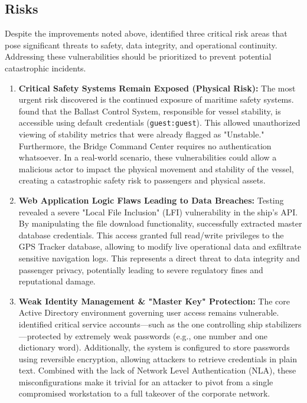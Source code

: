 \subsection{Risks}

Despite the improvements noted above, \team identified three critical risk areas that pose significant threats to \clientP safety, data integrity, and operational continuity. Addressing these vulnerabilities should be prioritized to prevent potential catastrophic incidents.

\begin{enumerate}
    \item \textbf{Critical Safety Systems Remain Exposed (Physical Risk):}  
    The most urgent risk discovered is the continued exposure of maritime safety systems. \team found that the Ballast Control System, responsible for vessel stability, is accessible using default credentials (\texttt{guest:guest}). This allowed unauthorized viewing of stability metrics that were already flagged as "Unstable." Furthermore, the Bridge Command Center requires no authentication whatsoever. In a real-world scenario, these vulnerabilities could allow a malicious actor to impact the physical movement and stability of the vessel, creating a catastrophic safety risk to passengers and physical assets.

    \item \textbf{Web Application Logic Flaws Leading to Data Breaches:}  
    Testing revealed a severe "Local File Inclusion" (LFI) vulnerability in the ship's API. By manipulating the file download functionality, \team successfully extracted master database credentials. This access granted full read/write privileges to the GPS Tracker database, allowing \team to modify live operational data and exfiltrate sensitive navigation logs. This represents a direct threat to data integrity and passenger privacy, potentially leading to severe regulatory fines and reputational damage.

    \item \textbf{Weak Identity Management \& "Master Key" Protection:}  
    The core Active Directory environment governing user access remains vulnerable. \team identified critical service accounts—such as the one controlling ship stabilizers—protected by extremely weak passwords (e.g., one number and one dictionary word). Additionally, the system is configured to store passwords using reversible encryption, allowing attackers to retrieve credentials in plain text. Combined with the lack of Network Level Authentication (NLA), these misconfigurations make it trivial for an attacker to pivot from a single compromised workstation to a full takeover of the corporate network.
\end{enumerate}